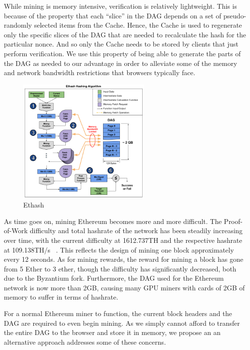 \documentclass[10pt, conference, compsocconf]{IEEEtran}
\begin{document}
While mining is memory intensive, verification is relatively lightweight. This is because of the property that each ``slice'' in the DAG depends on a set of pseudo-randomly selected items from the Cache. Hence, the Cache is used to regenerate only the specific slices of the DAG that are needed to recalculate the hash for the particular nonce. And so only the Cache needs to be stored by clients that just perform verification. We use this property of being able to generate the parts of the DAG as needed to our advantage in order to alleviate some of the memory and network bandwidth restrictions that browsers typically face.

\begin{figure}[H]
\centering
\includegraphics[width=250px,keepaspectratio]{ethash_algorithm.png}
\caption{\label{fig:ethash} Ethash}
\end{figure}

As time goes on, mining Ethereum becomes more and more difficult. The Proof-of-Work difficulty and total hashrate of the network has been steadily increasing over time, with the current difficulty at 1612.737TH and the respective hashrate at 109.138TH/s ~\cite{etherscan}. This reflects the design of mining one block approximately every 12 seconds. As for mining rewards, the reward for mining a block has gone from 5 Ether to 3 ether, though the difficulty has significantly decreased, both due to the Byzantium fork. Furthermore, the DAG used for the Ethereum network is now more than 2GB, causing many GPU miners with cards of 2GB of memory to suffer in terms of hashrate.

For a normal Ethereum miner to function, the current block headers and the DAG are required to even begin mining. As we simply cannot afford to transfer the entire DAG to the browser and store it in memory, we propose an an alternative approach addresses some of these concerns.
\end{document}
